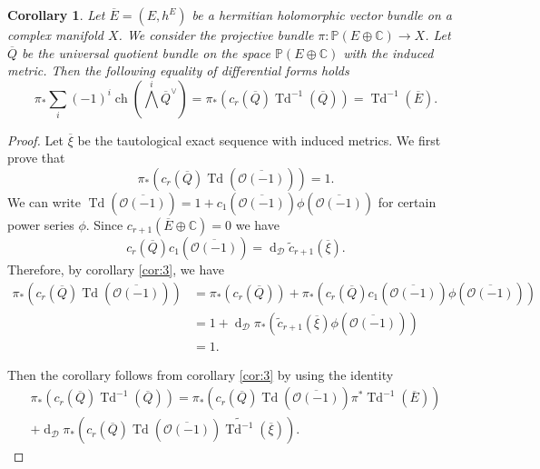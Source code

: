 \documentclass[10pt,twoside]{article}
\numberwithin{equation}{section}
\theoremstyle{plain}
\newtheorem{corollary}[equation]{Corollary}
\theoremstyle{definition}
\DeclareMathOperator{\Td}{Td}
\DeclareMathOperator{\dd}{d}
\DeclareMathOperator{\ch}{ch}
\begin{document}
\begin{corollary} \label{cor:4}
  Let $\overline E=(E,h^{E})$ be a hermitian holomorphic vector bundle
  on a complex 
  manifold $X$. We consider the projective bundle $\pi
  \colon\mathbb{P}(E\oplus \mathbb{C})\longrightarrow X$. Let $\overline
  {Q}$ be the 
  universal quotient bundle on the space 
  $\mathbb{P}(E\oplus \mathbb{C})$ with the induced metric. Then the
  following equality of differential forms holds 
  \begin{displaymath}
    \pi_{\ast}\sum_{i}(-1)^{i}\ch(\bigwedge ^{i}\overline
    {Q}^{\vee})=
    \pi_{\ast}(c_{r}(\overline {Q})\Td^{-1}(\overline
    {Q}))=\Td^{-1}(\overline {E}). 
  \end{displaymath}
\end{corollary}
\begin{proof}
  Let $\overline {\xi}$ be the tautological exact sequence with
  induced metrics. We first prove that
  \begin{displaymath}
    \pi_{\ast}(c_{r}(\overline Q)\Td(\overline {\mathcal{O}(-1)}))=1. 
  \end{displaymath}
We can write $\Td(\overline {\mathcal{O}(-1)})=1+c_{1}(\overline
{\mathcal{O}(-1)}) \phi (\overline
{\mathcal{O}(-1)})$ for certain power series $\phi $. Since
$c_{r+1}(\overline E\oplus \mathbb{C})=0$ we have 
\begin{displaymath}
  c_{r}(\overline
  Q)c_{1}(\overline{\mathcal{O}(-1)})=\dd_{\mathcal{D}}\widetilde{c}_{r+1}(\overline
  {\xi}). 
\end{displaymath}
Therefore, by corollary \ref{cor:3}, we have 
\begin{align*}
  \pi_{\ast}(c_{r}(\overline Q)\Td(\overline {\mathcal{O}(-1)}))&=
  \pi_{\ast}(c_{r}(\overline Q)) + \pi_{\ast}(c_{r}(\overline Q) c_{1}(\overline 
  {\mathcal{O}(-1)}) \phi (\overline
  {\mathcal{O}(-1)}))\\
  &= 1+\dd_{\mathcal{D}} \pi_{\ast}(\widetilde c_{r+1}(\overline
  \xi) \phi (\overline 
  {\mathcal{O}(-1)}))\\ 
  &=1. 
\end{align*}

Then the corollary follows from corollary \ref{cor:3} by using the identity 
\begin{multline*}
  \pi_{\ast}(c_{r}(\overline {Q})\Td^{-1}(\overline {Q}))=
  \pi_{\ast}(c_{r}(\overline Q)\Td(\overline {\mathcal{O}(-1)})
  \pi^{\ast}\Td^{-1}(\overline E))\\
  +\dd_{\mathcal{D}}
  \pi_{\ast}(c_{r}(\overline Q)\Td(\overline
  {\mathcal{O}(-1)})\widetilde {\Td^{-1}}(\overline \xi)).
\end{multline*}
\end{proof}
\end{document}

